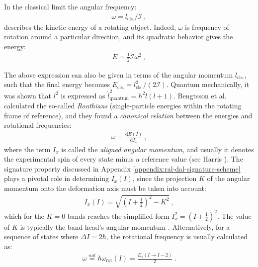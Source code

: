 In the classical limit the angular frequency:
\begin{align}
    \omega=l_\text{cls.}/\mathcal{I}\ ,
\end{align}
describes the kinetic energy of a rotating object. Indeed, $\omega$ is frequency of rotation around a particular direction, and its quadratic behavior gives the energy:
\begin{align}
    E=\frac{1}{2}\mathcal{I}\omega^2\ ,
\end{align}

The above expression can also be given in terms of the angular momentum $l_\text{cls.}$, such that the final energy becomes $E_\text{cls.}=l_\text{cls.}^2/(2\mathcal{I})$. Quantum mechanically, it was shown that $l^2$ is expressed as $\hat{l}^2_\text{quantum}=\hbar^2 l(l+1)$. Bengtsson et al. \cite{bengtsson1979quasiparticle} calculated the so-called \emph{Routhians} (single-particle energies within the rotating frame of reference), and they found a \emph {canonical relation} between the energies and rotational frequencies:
\begin{align}
    \omega=\frac{\text{d}E(I)}{\text{d}I_x}\ ,
    \label{rotational-frequency-canonical-definition}
\end{align}
where the term $I_x$ is called the \emph{aligned angular momentum}, and usually it denotes the experimental spin of every state minus a reference value (see Harris \cite{harris1965higher}). The signature property discussed in Appendix \ref{appendix:ral-dal-signature-scheme} plays a pivotal role in determining $I_x(I)$, since the projection $K$ of the angular momentum onto the deformation axis must be taken into account:
\begin{align}
    I_x(I)=\sqrt{\left(I+\frac{1}{2}\right)^2-K^2}\ ,
    \label{aligned-angular-momentum}
\end{align}
which for the $K=0$ bands reaches the simplified form $I_x^2=(I+\frac{1}{2})^2$. The value of $K$ is typically the band-head's angular momentum \cite{bengtsson1979quasiparticle,bengtsson1984signature}. Alternatively, for a sequence of states where $\Delta I=2\hbar$, the rotational frequency is usually calculated as:
\begin{align}
    \omega\stackrel{not}{=}\hbar\omega_\text{rot}(I)=\frac{E_\gamma(I\to I-2)}{2}\ .
    \label{rotational-frequency-canonical}
\end{align}


